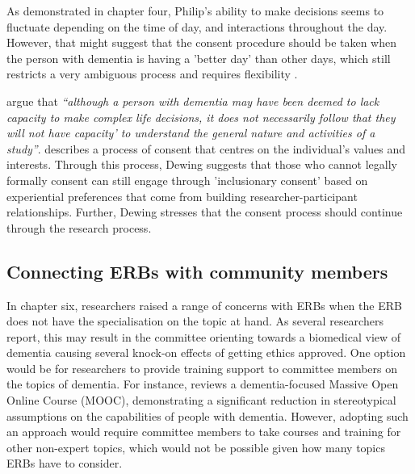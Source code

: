 As demonstrated in chapter four, Philip's ability to make decisions seems to fluctuate depending on the time of day, and interactions throughout the day. However, that might suggest that the consent procedure should be taken when the person with dementia is having a 'better day' than other days, which still restricts a very ambiguous process and requires flexibility \citep{trachsel2015cognitive}. 

\cite{o2021advocating} argue that \textit{``although a person with dementia may have been deemed to lack capacity to make complex life decisions, it does not necessarily follow that they will not have capacity' to understand the general nature and activities of a study''}. \cite{dewing_participatory_2007} describes a process of consent that centres on the individual's values and interests. Through this process, Dewing suggests that those who cannot legally formally consent can still engage through 'inclusionary consent' based on experiential preferences that come from building researcher-participant relationships. Further, Dewing stresses that the consent process should continue through the research process.

\subsection{Connecting ERBs with community members}
\label{ERBs-Community-Members}
In chapter six, researchers raised a range of concerns with ERBs when the ERB does not have the specialisation on the topic at hand. As several researchers report, this may result in the committee orienting towards a biomedical view of dementia causing several knock-on effects of getting ethics approved. One option would be for researchers to provide training support to committee members on the topics of dementia. For instance, \cite{goldberg2015relationship} reviews a dementia-focused Massive Open Online Course (MOOC), demonstrating a significant reduction in stereotypical assumptions on the capabilities of people with dementia. However, adopting such an approach would require committee members to take courses and training for other non-expert topics, which would not be possible given how many topics ERBs have to consider. 

